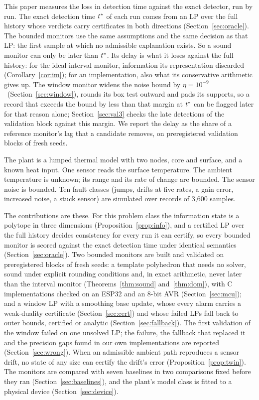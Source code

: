 This paper measures the loss in detection time against the exact detector, run by run. The exact detection time
$t^{\ast}$ of each run comes from an LP over the full history whose verdicts carry certificates in both directions
(Section~\ref{sec:oracle}). The bounded monitors use the same assumptions and the same decision as that LP: the first
sample at which no admissible explanation exists. So a sound monitor can only be later than $t^{\ast}$. Its delay is
what it loses against the full history: for the ideal interval monitor, information its representation discarded
(Corollary~\ref{cor:im}); for an implementation, also what its conservative arithmetic gives up. The window monitor
widens the noise bound by $\eta = 10^{-9}$\,\degC\ (Section~\ref{sec:window}), rounds its box test outward and pads
its supports, so a record that exceeds the bound by less than that margin at $t^{\ast}$ can be flagged later for that
reason alone; Section~\ref{sec:val3} checks the late detections of the validation block against this margin. We
report the delay as the share of a
reference monitor's lag that a candidate removes, on preregistered validation blocks of fresh seeds.

The plant is a lumped thermal model with two nodes, core and surface, and a known heat input. One sensor reads the
surface temperature. The ambient temperature is unknown; its range and its rate of change are bounded. The sensor
noise is bounded. Ten fault classes (jumps, drifts at five rates, a gain error, increased noise, a stuck sensor) are
simulated over records of 3,600 samples.

The contributions are these. For this problem class the information state is a polytope in three dimensions
(Proposition~\ref{prop:info}), and a certified LP over the full history decides consistency for every run it can
certify, so every bounded monitor is scored against the exact detection time under identical semantics
(Section~\ref{sec:oracle}). Two bounded monitors are built and validated on preregistered blocks of fresh seeds: a
template polyhedron that needs no solver, sound under explicit rounding conditions and, in exact arithmetic, never
later than the interval monitor (Theorems~\ref{thm:sound} and~\ref{thm:dom}), with C implementations checked on an
ESP32 and an 8-bit AVR (Section~\ref{sec:mcu}); and a window LP with a smoothing base update, whose every alarm carries
a weak-duality certificate (Section~\ref{sec:cert}) and whose failed LPs fall back to outer bounds, certified or
analytic (Section~\ref{sec:fallback}). The first
validation of the window failed on one unsolved LP; the failure, the fallback that replaced it and the precision gaps
found in our own implementations are reported (Section~\ref{sec:wrong}). When an admissible ambient path reproduces
a sensor drift, no state of any size can certify the drift's error (Proposition~\ref{prop:twin}). The monitors are
compared with seven baselines in two comparisons fixed before they ran (Section~\ref{sec:baselines}), and the
plant's model class is fitted to a physical device (Section~\ref{sec:device}).

